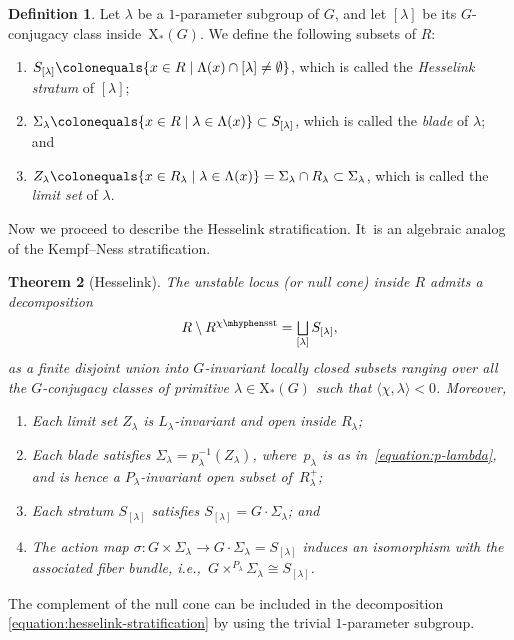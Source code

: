 \documentclass[11pt]{article}
\let\oldbigsqcup\bigsqcup
\renewcommand{\bigsqcup}{\mathop{\textstyle\oldbigsqcup}\displaylimits}
\theoremstyle{plain}
\newtheorem{theorem}{Theorem}[section]
\theoremstyle{definition}
\newtheorem{definition}[theorem]{Definition}
\newcommand\blade[1][]{\Sigma_{#1}}
\newcommand\cocharacters{\ensuremath{\mathrm{X}_*}}
\newcommand\semistable{\ensuremath{\mhyphen\mathrm{sst}}}
\begin{document}
\begin{definition}
Let $\lambda$ be a $1$-parameter subgroup of $G$,
and let $[\lambda]$ be its $G$\nobreakdash-conjugacy class inside~$\cocharacters(G)$.
We define the following subsets of $R$:
\begin{enumerate}
\item $S_{[\lambda]}\colonequals \{ x \in R \mid \Lambda(x) \cap [\lambda] \neq \emptyset \}$,
which is called the \emph{Hesselink stratum} of $[\lambda]$;
\item $\blade[\lambda]\colonequals \{ x \in R \mid \lambda \in \Lambda(x) \}\subset S_{[\lambda]}$,
which is called the \emph{blade} of $\lambda$; and
\item $Z_\lambda\colonequals \{ x \in R_\lambda \mid \lambda \in \Lambda(x)\} = \blade[\lambda] \cap R_\lambda\subset\blade[\lambda]$,
which is called the \emph{limit set} of $\lambda$.
\end{enumerate}
\end{definition}

Now we proceed to describe the Hesselink stratification. It~is an algebraic analog of the Kempf--Ness stratification.

\begin{theorem}[Hesselink]
\label{theorem:hesselink}
The unstable locus (or null cone) inside $R$ admits a decomposition
\begin{equation}
\label{equation:hesselink-stratification}
R\setminus R^{\chi\semistable} = \bigsqcup_{[\lambda]} S_{[\lambda]},
\end{equation}
as a finite disjoint union into $G$-invariant locally closed subsets
ranging over all the $G$-conjugacy classes of primitive $\lambda \in \cocharacters(G)$
such that $\langle \chi,\lambda \rangle < 0$.
Moreover,
\begin{enumerate}
\item Each limit set $Z_\lambda$ is $L_\lambda$-invariant and open inside $R_\lambda$;
\item Each blade satisfies $\blade[\lambda] = p_\lambda^{-1}(Z_\lambda)$,
where~$p_\lambda$ is as in~\eqref{equation:p-lambda},
and is hence a $P_\lambda$\nobreakdash-invari\-ant open subset of~$R_\lambda^+$;
\item Each stratum $S_{[\lambda]}$ satisfies $S_{[\lambda]} = G \cdot \blade[\lambda]$; and
\item The action map $\sigma\colon G\times \blade[\lambda] \to G\cdot \blade[\lambda] = S_{[\lambda]}$
induces an isomorphism with the associated fiber bundle,
i.e.,~$G\times^{P_\lambda} \blade[\lambda] \cong S_{[\lambda]}$.
\end{enumerate}
\end{theorem}
The complement of the null cone can be included in the decomposition \eqref{equation:hesselink-stratification}
by using the trivial $1$-parameter subgroup.
\end{document}
